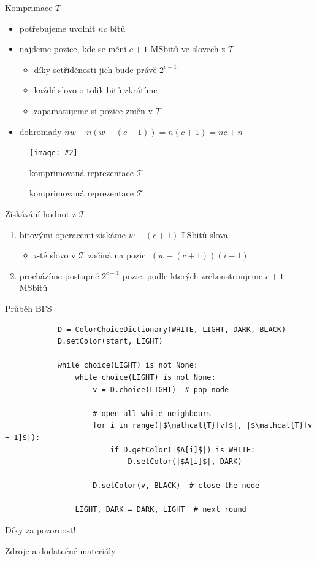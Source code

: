 \documentclass[czech]{beamer}
\makeatletter
\newcommand{\fitimage}[2][\@nil]{
	\begin{figure}
		\begin{adjustbox}{width=0.9\textwidth, totalheight=\textheight-2\baselineskip-2\baselineskip,keepaspectratio}
			\texttt{[image: \#2]}
		\end{adjustbox}
		\def\tmp{#1}%
	 \ifx\tmp\@nnil
			\else
			\caption{#1}
		\fi
	\end{figure}
}
\makeatother
\begin{document}
	\begin{frame}{Komprimace $T$}
		\begin{itemize}
			\item potřebujeme uvolnit $nc$ bitů
			\item najdeme pozice, kde se mění $c + 1$ MSbitů ve slovech z $T$
			\begin{itemize}
				\item díky setříděnosti jich bude právě $2^{c - 1}$
				\item každé slovo o tolik bitů zkrátíme
				\item zapamatujeme si pozice změn v $T$
			\end{itemize}
			\item dohromady $nw - n(w - (c + 1)) = n(c + 1) = nc + n$
		\end{itemize}

		\fitimage[komprimovaná reprezentace $\mathcal{T}$]{images/compression.png}
	\end{frame}

	\begin{frame}{Získávání hodnot z $\mathcal{T}$}
		\begin{enumerate}
			\item bitovými operacemi získáme $w - (c + 1)$ LSbitů slova
			\begin{itemize}
				\item $i$-té slovo v $\mathcal{T}$ začíná na pozici $(w - (c + 1))(i - 1)$
			\end{itemize}
			\item procházíme postupně $2^{c - 1}$ pozic, podle kterých zrekonstruujeme $c + 1$ MSbitů
		\end{enumerate}
	\end{frame}


	\begin{frame}[fragile]{Průběh BFS}
		\small
		\begin{verbatim}
			D = ColorChoiceDictionary(WHITE, LIGHT, DARK, BLACK)
			D.setColor(start, LIGHT)

			while choice(LIGHT) is not None:
				while choice(LIGHT) is not None:
					v = D.choice(LIGHT)  # pop node

					# open all white neighbours
					for i in range(|$\mathcal{T}[v]$|, |$\mathcal{T}[v + 1]$|):
						if D.getColor(|$A[i]$|) is WHITE:
							D.setColor(|$A[i]$|, DARK)

					D.setColor(v, BLACK)  # close the node

				LIGHT, DARK = DARK, LIGHT  # next round
		\end{verbatim}
	\end{frame}

	\begin{frame}[focus]
		Díky za pozornost!
	\end{frame}
	
	\appendix
	\begin{frame}{Zdroje a dodatečné materiály}
		\nocite{*}
		
		
	\end{frame}
\end{document}
